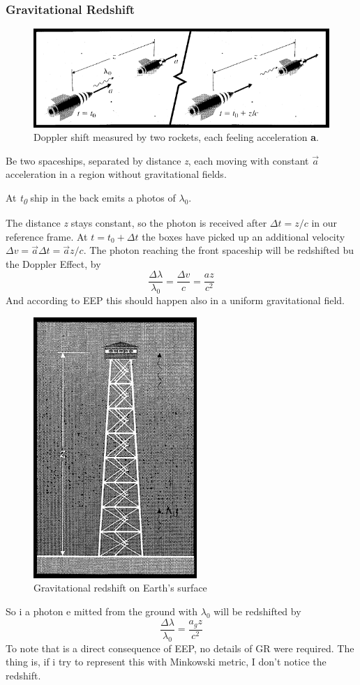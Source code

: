 \subsubsection{Gravitational Redshift}
\begin{figure}[h]
\centering
\includegraphics[width=0.8\linewidth]{imm/gravshift1.png}
\caption{Doppler shift measured by two rockets, each feeling acceleration \textbf{a}.}
\label{imm:gravshift1.png}
\end{figure}

Be two spaceships, separated by distance \emph{z}, each moving with constant $\vec{a}$ acceleration in a region without gravitational fields. \par
At \emph{t\textsubscript{0}} ship in the back emits a photos of $\lambda_{0}$.\par
The distance \emph{z} stays constant, so the photon is received after $\Delta t = z/c$ in our reference frame. At $t = t_{0}+ \Delta t$ the boxes have picked up an additional velocity $\Delta v = \vec{a}\Delta t = \vec{a}z/c$. The photon reaching the front spaceship will be redshifted bu the Doppler Effect, by \[
\frac{\Delta \lambda }{\lambda_{0}} = \frac{\Delta v}{c} = \frac{a z}{c^{2}}
\]
And according to EEP this should happen also in a uniform gravitational field.\par
\begin{figure}[h]
\centering
\includegraphics[width=0.3\linewidth]{imm/gravshift2.png}
\caption{Gravitational redshift on Earth's surface}
\label{imm:gravshift2}
\end{figure}
So i a photon e mitted from the ground with $\lambda_{0}$ will be redshifted by
\[
\frac{\Delta  \lambda }{\lambda_{0}} = \frac{a_{g}z}{c^{2}}
\]
To note that is a direct consequence of EEP, no details of GR were required.
The thing is, if i try to represent this with Minkowski metric, I don't notice the redshift.

